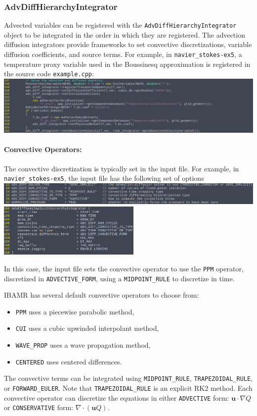 \documentclass{article}
\newcommand{\bu}{\mathbf{u}}
\newcommand{\grad}{\nabla}
\begin{document}
\subsubsection{AdvDiffHierarchyIntegrator}
Advected variables can be registered with the \verb|AdvDiffHierarchyIntegrator| object to be integrated in the order in which they are registered. The advection diffusion integrators provide frameworks to set convective discretizations, variable diffusion coefficients, and source terms. For example, in \verb|navier_stokes-ex5|, a temperature proxy variable used in the Boussinesq approximation is registered in the source code \verb|example.cpp|: \\
\includegraphics[width=\textwidth]{Graphs/NS-ex5/advected_quantity.png}


\paragraph{Convective Operators:} The convective discretization is typically set in the input file. For example, in \verb|navier_stokes-ex5|, the input file has the following set of options \\
\includegraphics[width=\textwidth]{Graphs/NS-ex5/AdvDiffIntegrator_options.png} 
\includegraphics[width=0.52\textwidth]{Graphs/NS-ex5/AdvDiffIntegrator_DB.png}

In this case, the input file sets the convective operator to use the \verb|PPM| operator, discretized in \verb|ADVECTIVE_FORM|, using a \verb|MIDPOINT_RULE| to discretize in time.

IBAMR has several default convective operators to choose from:
\begin{itemize}
\item \verb|PPM| uses a piecewise parabolic method,
\item \verb|CUI| uses a cubic upwinded interpolant method,
\item \verb|WAVE_PROP| uses a wave propagation method,
\item \verb|CENTERED| uses centered differences.
\end{itemize}
The convective terms can be integrated using \verb|MIDPOINT_RULE|, \verb|TRAPEZOIDAL_RULE|, or \verb|FORWARD_EULER|. Note that \verb|TRAPEZOIDAL_RULE| is an explicit RK2 method. Each convective operator can discretize the equations in either \verb|ADVECTIVE| form: $\bu\cdot\grad Q$ or \verb|CONSERVATIVE| form: $\grad\cdot(\bu Q)$.
\end{document}

